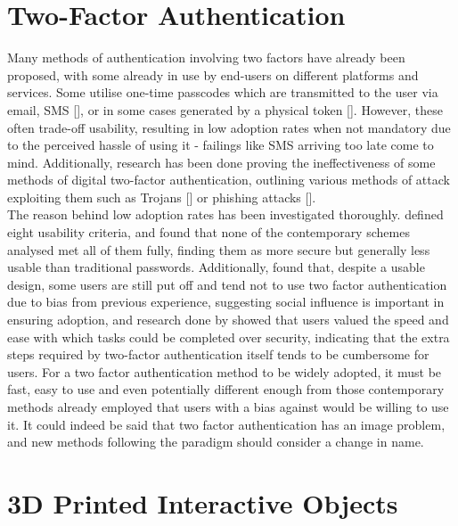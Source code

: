 \documentclass{l4proj}
\begin{document}
\section{Two-Factor Authentication}
 
 Many methods of authentication involving two factors have already been proposed, with some already in use by end-users on different platforms and services. Some utilise one-time passcodes which are transmitted to the user via email, SMS [\cite{5069395}], or in some cases generated by a physical token [\cite{duo}]. However, these often trade-off usability, resulting in low adoption rates when not mandatory due to the perceived hassle of using it - failings like SMS arriving too late come to mind. Additionally, research has been done proving the ineffectiveness of some methods of digital two-factor authentication, outlining various methods of attack exploiting them such as Trojans [\cite{dmitrienko2014security}] or phishing attacks [\cite{markert2019view}]. \\
 The reason behind low adoption rates has been investigated thoroughly. \cite{bonneau2012quest} defined eight usability criteria, and found that none of the contemporary schemes analysed met all of them fully, finding them as more secure but generally less usable than traditional passwords. Additionally, \cite{colnago2018s} found that, despite a usable design, some users are still put off and tend not to use two factor authentication due to bias from previous experience, suggesting social influence is important in ensuring adoption, and research done by \cite{dewitt2006aligning} showed that users valued the speed and ease with which tasks could be completed over security, indicating that the extra steps required by two-factor authentication itself tends to be cumbersome for users. For a two factor authentication method to be widely adopted, it must be fast, easy to use and even potentially different enough from those contemporary methods already employed that users with a bias against would be willing to use it. It could indeed be said that two factor authentication has an image problem, and new methods following the paradigm should consider a change in name.

\section{3D Printed Interactive Objects}
\end{document}
